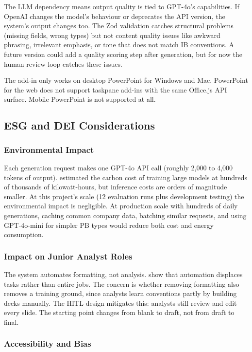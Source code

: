 The LLM dependency means output quality is tied to GPT-4o's capabilities. If OpenAI changes the model's behaviour or deprecates the API version, the system's output changes too. The Zod validation catches structural problems (missing fields, wrong types) but not content quality issues like awkward phrasing, irrelevant emphasis, or tone that does not match IB conventions. A future version could add a quality scoring step after generation, but for now the human review loop catches these issues.

The add-in only works on desktop PowerPoint for Windows and Mac. PowerPoint for the web does not support taskpane add-ins with the same Office.js API surface. Mobile PowerPoint is not supported at all.

\subsection{ESG and DEI Considerations}

\subsubsection{Environmental Impact}

Each generation request makes one GPT-4o API call (roughly 2,000 to 4,000 tokens of output). \textcite{strubell2019} estimated the carbon cost of training large models at hundreds of thousands of kilowatt-hours, but inference costs are orders of magnitude smaller. At this project's scale (12 evaluation runs plus development testing) the environmental impact is negligible. At production scale with hundreds of daily generations, caching common company data, batching similar requests, and using GPT-4o-mini for simpler PB types would reduce both cost and energy consumption.

\subsubsection{Impact on Junior Analyst Roles}

The system automates formatting, not analysis. \textcite{autor2022} show that automation displaces tasks rather than entire jobs. The concern is whether removing formatting also removes a training ground, since analysts learn conventions partly by building decks manually. The HITL design mitigates this: analysts still review and edit every slide. The starting point changes from blank to draft, not from draft to final.

\subsubsection{Accessibility and Bias}

